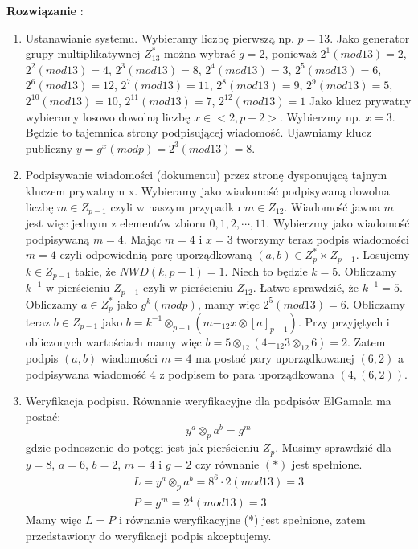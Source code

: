 \documentclass[a4paper,10pt, twocolumn]{article}
\begin{document}
\textbf{Rozwiązanie} : 
\begin{enumerate}
 \item Ustanawianie systemu. Wybieramy liczbę pierwszą np. $p=13$. Jako generator grupy multiplikatywnej $Z^*_{13}$ można wybrać $g=2$, ponieważ $2^1(mod13)=2$, $2^2(mod13)=4$,  $2^3(mod13)=8$, $2^4(mod13)=3$, $2^5(mod13)=6$, $2^6(mod13)=12$, $2^7(mod13)=11$, $2^8(mod13)=9$, $2^9(mod13)=5$, $2^{10}(mod13)=10$, $2^{11}(mod13)=7$, $2^{12}(mod13)=1$
 Jako klucz prywatny wybieramy losowo dowolną liczbę $x \in <2,p-2>$. Wybierzmy np. $x=3$. Będzie to tajemnica strony podpisującej wiadomość. Ujawniamy klucz publiczny $y=g^x(modp)=2^3(mod13)=8$.
 \item Podpisywanie wiadomości (dokumentu) przez stronę dysponującą tajnym kluczem prywatnym x.
 Wybieramy jako wiadomość podpisywaną dowolna liczbę $m \in Z_{p-1}$ czyli w naszym przypadku $m \in Z_{12}$. Wiadomość jawna $m$ jest więc jednym z elementów zbioru ${0,1,2,\cdots,11}$. Wybierzmy jako wiadomość podpisywaną $m=4$. Mając $m=4$ i $x=3$ tworzymy teraz podpis wiadomości $m=4$ czyli odpowiednią parę uporządkowaną $(a, b) \in Z^*_p \times Z_{p-1}$.
 Losujemy $k \in Z_{p-1}$ takie, że $NWD(k,p-1)=1$. Niech to będzie $k=5$. Obliczamy $k^{-1}$ w pierścieniu $Z_{p-1}$ czyli w pierścieniu $Z_{12}$. Łatwo sprawdzić, że  $k^{-1}=5$. Obliczamy $a \in Z^*_p$ jako $g^k(modp)$, mamy więc $2^5(mod13)=6$.
 Obliczamy teraz $b \in Z_{p-1}$ jako $b=k^{-1}\otimes_{p-1}(m-_{12}x\otimes[a]_{p-1})$. Przy przyjętych i obliczonych wartościach mamy więc $b=5\otimes_{12}(4-_{12}3\otimes_{12}6)=2$. Zatem podpis $(a,b)$ wiadomości $m=4$ ma postać pary uporządkowanej $(6,2)$ a podpisywana wiadomość $4$ z podpisem to para uporządkowana $(4,(6,2))$.
 \item Weryfikacja podpisu. Równanie weryfikacyjne dla podpisów ElGamala ma postać: 
 \begin{equation*}
  y^a\otimes_p a^b=g^m
 \end{equation*}
 gdzie podnoszenie do potęgi jest jak pierścieniu $Z_p$. Musimy sprawdzić dla $y=8$, $a=6$, $b=2$, $m=4$ i $g=2$ czy równanie $(*)$ jest spełnione.
 \begin{equation*}
  \begin{array}{c}L=y^a\otimes_p a^b=8^6\cdot2(mod13)=3 \\ P=g^m=2^4(mod13)=3\end{array}
 \end{equation*}
 Mamy więc $L=P$ i równanie weryfikacyjne (*) jest spełnione, zatem przedstawiony do weryfikacji podpis akceptujemy.
\end{enumerate}
\end{document}
